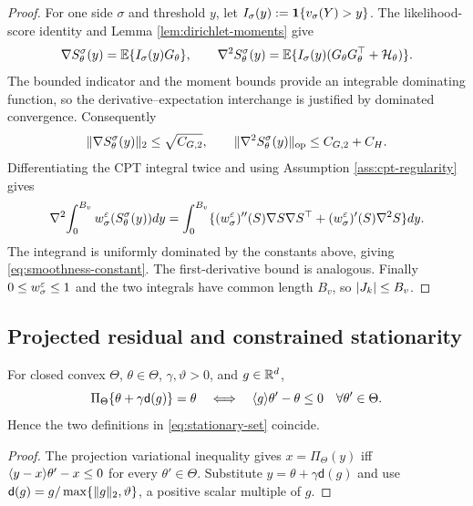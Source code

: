 \begin{proof}
For one side $\sigma$ and threshold $y$, let $I_\sigma(y):=\mathbf 1\{v_\sigma(Y)>y\}$.  The likelihood-score identity and Lemma \ref{lem:dirichlet-moments} give
\[
 \nabla S_\theta^\sigma(y)=\mathbb E\{I_\sigma(y)G_\theta\},
 \qquad
 \nabla^2S_\theta^\sigma(y)
 =\mathbb E\{I_\sigma(y)(G_\theta G_\theta^\top+\mathcal H_\theta)\}.
\]
The bounded indicator and the moment bounds provide an integrable dominating function, so the derivative--expectation interchange is justified by dominated convergence.  Consequently
\[
 \lVert\nabla S_\theta^\sigma(y)\rVert_2\le\sqrt{C_{G,2}},
 \qquad
 \lVert\nabla^2S_\theta^\sigma(y)\rVert_{\mathrm{op}}\le C_{G,2}+C_H.
\]
Differentiating the CPT integral twice and using Assumption \ref{ass:cpt-regularity} gives
\[
 \nabla^2\!\int_0^{B_v}w_\sigma^\varepsilon(S_\theta^\sigma(y))dy
 =\int_0^{B_v}
 \{(w_\sigma^\varepsilon)''(S)\nabla S\nabla S^\top
 +(w_\sigma^\varepsilon)'(S)\nabla^2S\}dy.
\]
The integrand is uniformly dominated by the constants above, giving \eqref{eq:smoothness-constant}.  The first-derivative bound is analogous.  Finally $0\le w_\sigma^\varepsilon\le1$ and the two integrals have common length $B_v$, so $\lvert J_k\rvert\le B_v$.
\end{proof}

\subsection{Projected residual and constrained stationarity}

\begin{lemma}\label{lem:residual-stationarity}
For closed convex $\Theta$, $\theta\in\Theta$, $\gamma,\vartheta>0$, and $g\in\mathbb R^d$,
\begin{equation}\label{eq:projection-stationarity-equivalence}
 \Pi_\Theta\{\theta+\gamma\mathsf d(g)\}=\theta
 \quad\Longleftrightarrow\quad
 \langle g\rangle{\theta'-\theta}\le0\quad\forall \theta'\in\Theta.
\end{equation}
Hence the two definitions in \eqref{eq:stationary-set} coincide.
\end{lemma}

\begin{proof}
The projection variational inequality gives
$x=\Pi_\Theta(y)$ iff $\langle y-x\rangle{\theta'-x}\le0$ for every $\theta'\in\Theta$.  Substitute $y=\theta+\gamma\mathsf d(g)$ and use
$\mathsf d(g)=g/\max\{\lVert g\rVert_2,\vartheta\}$, a positive scalar multiple of $g$.
\end{proof}
